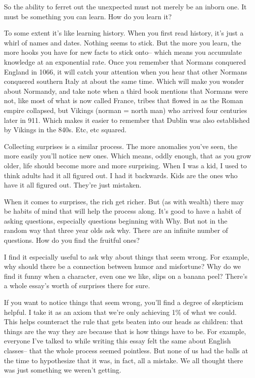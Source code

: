 So the ability to ferret out the unexpected must not merely be an inborn
one. It must be something you can learn. How do you learn it?

To some extent it's like learning history. When you first read history,
it's just a whirl of names and dates. Nothing seems to stick. But the
more you learn, the more hooks you have for new facts to stick onto--
which means you accumulate knowledge at an exponential rate. Once you
remember that Normans conquered England in 1066, it will catch your
attention when you hear that other Normans conquered southern Italy at
about the same time. Which will make you wonder about Normandy, and take
note when a third book mentions that Normans were not, like most of what
is now called France, tribes that flowed in as the Roman empire
collapsed, but Vikings (norman = north man) who arrived four centuries
later in 911. Which makes it easier to remember that Dublin was also
established by Vikings in the 840s. Etc, etc squared.

Collecting surprises is a similar process. The more anomalies you've
seen, the more easily you'll notice new ones. Which means, oddly enough,
that as you grow older, life should become more and more surprising.
When I was a kid, I used to think adults had it all figured out. I had
it backwards. Kids are the ones who have it all figured out. They're
just mistaken.

When it comes to surprises, the rich get richer. But (as with wealth)
there may be habits of mind that will help the process along. It's good
to have a habit of asking questions, especially questions beginning with
Why. But not in the random way that three year olds ask why. There are
an infinite number of questions. How do you find the fruitful ones?

I find it especially useful to ask why about things that seem wrong. For
example, why should there be a connection between humor and misfortune?
Why do we find it funny when a character, even one we like, slips on a
banana peel? There's a whole essay's worth of surprises there for sure.

If you want to notice things that seem wrong, you'll find a degree of
skepticism helpful. I take it as an axiom that we're only achieving 1\%
of what we could. This helps counteract the rule that gets beaten into
our heads as children: that things are the way they are because that is
how things have to be. For example, everyone I've talked to while
writing this essay felt the same about English classes-- that the whole
process seemed pointless. But none of us had the balls at the time to
hypothesize that it was, in fact, all a mistake. We all thought there
was just something we weren't getting.


